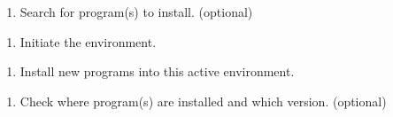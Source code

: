 \documentclass[]{book}
\newenvironment{Shaded}{\begin{snugshade}}{\end{snugshade}}
\newcommand{\StringTok}[1]{\textcolor[rgb]{0.31,0.60,0.02}{#1}}
\newcommand{\OperatorTok}[1]{\textcolor[rgb]{0.81,0.36,0.00}{\textbf{#1}}}
\newcommand{\NormalTok}[1]{#1}
\providecommand{\tightlist}{%
  \setlength{\itemsep}{0pt}\setlength{\parskip}{0pt}}
\begin{document}
\begin{Shaded}
\end{Shaded}

\begin{enumerate}
\def\labelenumi{\arabic{enumi}.}
\setcounter{enumi}{7}
\tightlist
\item
  Search for program(s) to install. (optional)
\end{enumerate}

\begin{Shaded}
\end{Shaded}

\begin{enumerate}
\def\labelenumi{\arabic{enumi}.}
\setcounter{enumi}{8}
\tightlist
\item
  Initiate the environment.
\end{enumerate}

\begin{Shaded}
\end{Shaded}

\begin{enumerate}
\def\labelenumi{\arabic{enumi}.}
\setcounter{enumi}{9}
\tightlist
\item
  Install new programs into this active environment.
\end{enumerate}

\begin{Shaded}
\end{Shaded}

\begin{enumerate}
\def\labelenumi{\arabic{enumi}.}
\setcounter{enumi}{10}
\tightlist
\item
  Check where program(s) are installed and which version. (optional)
\end{enumerate}
\end{document}
